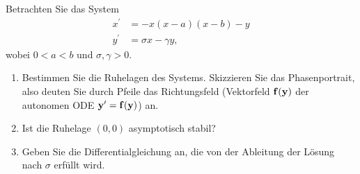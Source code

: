 \begin{exercise}
Betrachten Sie das System
\begin{align*}
  x^{\prime} &= -x(x - a)(x - b) - y \\
  y^{\prime} &= \sigma x - \gamma y,
\end{align*}
wobei $0 < a < b$ und $\sigma, \gamma > 0$.
\begin{enumerate}[label = \textbf{\alph*)}]
\item Bestimmen Sie die Ruhelagen des Systems. Skizzieren Sie das Phasenportrait,
also deuten Sie durch Pfeile das Richtungsfeld (Vektorfeld $\bf{f(y)}$ der
autonomen ODE $\bf{y^{\prime} = f(y)}$) an.
\item Ist die Ruhelage $(0,0)$ asymptotisch stabil?
\item Geben Sie die Differentialgleichung an, die von der Ableitung der Lösung
nach $\sigma$ erfüllt wird.
\end{enumerate}
\end{exercise}
